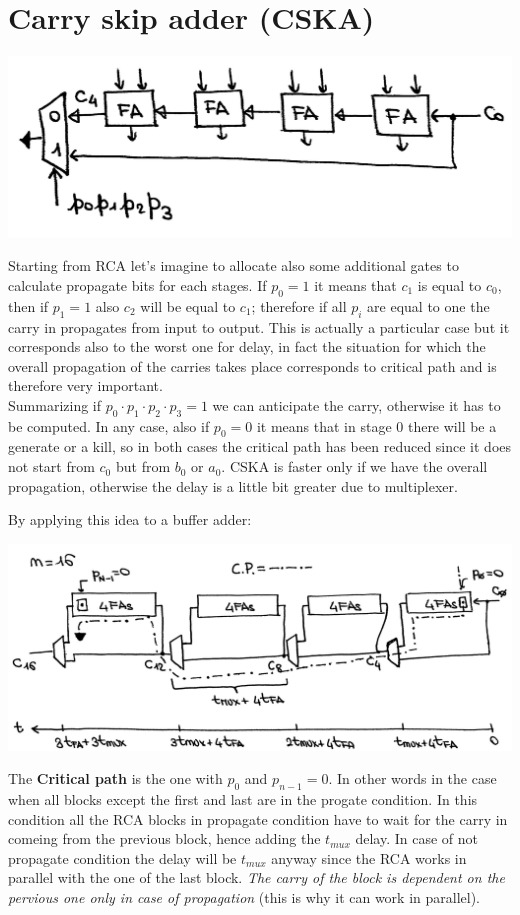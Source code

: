 \section{Carry skip adder (CSKA)}

\begin{center}
  \includegraphics[width=0.7\linewidth]{img/img2/4}
\end{center}


Starting from RCA let's imagine to allocate also some additional gates to
calculate propagate bits for each stages. If $p_0=1$ it means that $c_1$
is equal to $c_0$, then if $p_1=1$ also $c_2$ will be equal to $c_1$;
therefore if all $p_i$ are equal to one the carry in propagates from input to
output. This is actually a particular case but it corresponds also to the worst
one for delay, in fact the situation for which the overall propagation of the
carries takes place corresponds to critical path and is therefore very
important.\\ Summarizing if $p_0\cdot p_1 \cdot p_2 \cdot p_3=1$ we can
anticipate the carry, otherwise it has to be computed. In any case, also
if $p_0=0$ it means that in stage 0 there will be a generate or a kill, so in
both cases the critical path has been reduced since it does not start from
$c_0$ but from $b_0$ or $a_0$. CSKA is faster only if we have the overall
propagation, otherwise the delay is a little bit greater due to multiplexer.

By applying this idea to a buffer adder:
\begin{center}
  \includegraphics[width=0.8\linewidth]{img/img2/5}
\end{center}

The \textbf{Critical path} is the one with $p_0$ and $p_{n-1} = 0$. In other 
words in the case when all blocks except the first and last are in the progate 
condition.
In this condition all the RCA blocks in propagate condition have to wait for the
carry in comeing from the previous block, hence adding the $t_{mux}$ delay.
In case of not propagate condition the delay will be $t_{mux}$ anyway since the
RCA works in parallel with the one of the last block. \textit{The carry of the 
block is dependent on the pervious one only in case of propagation} (this is why
it can work in parallel).

